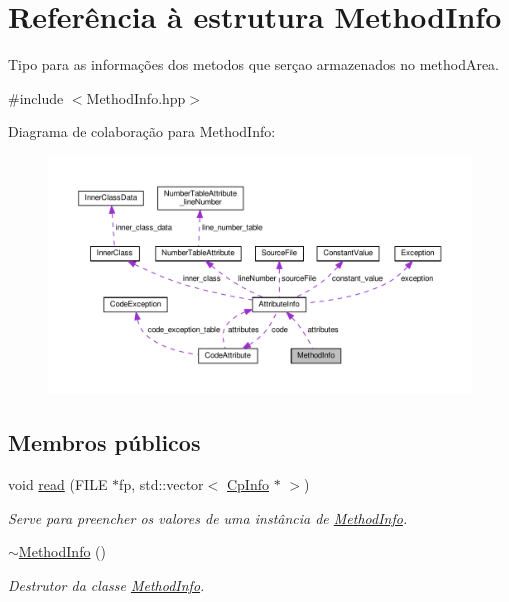\hypertarget{struct_method_info}{}\section{Referência à estrutura Method\+Info}
\label{struct_method_info}


Tipo para as informações dos metodos que serçao armazenados no method\+Area.  




{\ttfamily \#include $<$Method\+Info.\+hpp$>$}



Diagrama de colaboração para Method\+Info\+:
\nopagebreak
\begin{figure}[H]
\begin{center}
\leavevmode
\includegraphics[width=350pt]{struct_method_info__coll__graph}
\end{center}
\end{figure}
\subsection*{Membros públicos}
\begin{DoxyCompactItemize}
\item 
void \hyperlink{struct_method_info_a96fbb8de441ef2af032c20d36d41eb7a}{read} (F\+I\+LE $\ast$fp, std\+::vector$<$ \hyperlink{class_cp_info}{Cp\+Info} $\ast$ $>$)
\begin{DoxyCompactList}\small\item\em Serve para preencher os valores de uma instância de \hyperlink{struct_method_info}{Method\+Info}. \end{DoxyCompactList}\item 
\hyperlink{struct_method_info_ab2a081a2855eec567e82adfff26059cd}{$\sim$\+Method\+Info} ()
\begin{DoxyCompactList}\small\item\em Destrutor da classe \hyperlink{struct_method_info}{Method\+Info}. \end{DoxyCompactList}\end{DoxyCompactItemize}
